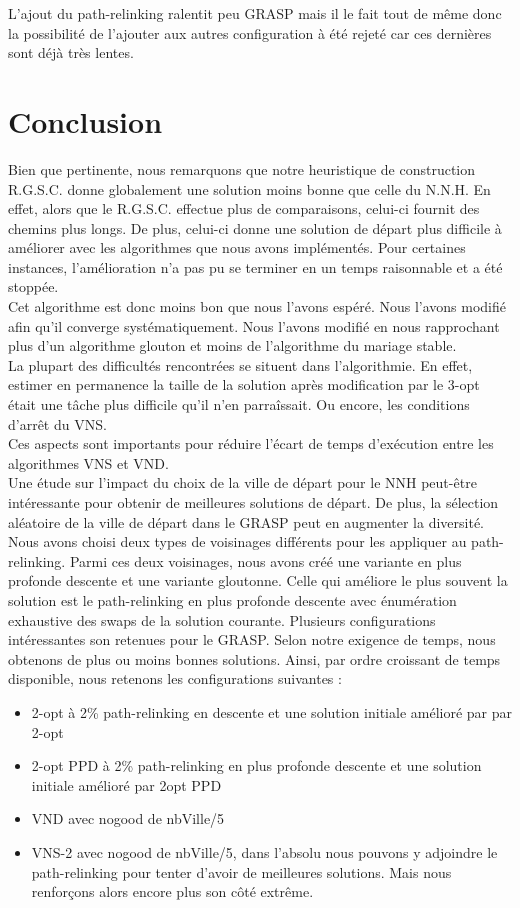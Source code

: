 \documentclass[12pt,a4paper]{article}
\begin{document}
L'ajout du path-relinking ralentit peu GRASP mais il le fait tout de même donc la possibilité de l'ajouter aux autres configuration à été rejeté car ces dernières sont déjà très lentes.\\

\section{Conclusion}
Bien que pertinente, nous remarquons que notre heuristique de construction R.G.S.C. donne globalement une solution moins bonne que celle du N.N.H. En effet, alors que le R.G.S.C. effectue plus de comparaisons, celui-ci fournit des chemins plus longs. De plus, celui-ci donne une solution de départ plus difficile à améliorer avec les algorithmes que nous avons implémentés. Pour certaines instances, l'amélioration n'a pas pu se terminer en un temps raisonnable et a été stoppée.\\
Cet algorithme est donc moins bon que nous l'avons espéré. Nous l'avons modifié afin qu'il converge systématiquement. Nous l'avons modifié en nous rapprochant plus d'un algorithme glouton et moins de l'algorithme du mariage stable. \\
La plupart des difficultés rencontrées se situent dans l'algorithmie. En effet, estimer en permanence la taille de la solution après modification par le 3-opt était une tâche plus difficile qu'il n'en parraîssait. Ou encore, les conditions d'arrêt du VNS.\\
Ces aspects sont importants pour réduire l'écart de temps d’exécution entre les algorithmes VNS et VND.\\
Une étude sur l'impact du choix de la ville de départ pour le NNH peut-être intéressante pour obtenir de meilleures solutions de départ. De plus, la sélection aléatoire de la ville de départ dans le GRASP peut en augmenter la diversité.\\
Nous avons choisi deux types de voisinages différents pour les appliquer au path-relinking. Parmi ces deux voisinages, nous avons créé une variante en plus profonde descente et une variante gloutonne. Celle qui améliore le plus souvent la solution est le path-relinking en plus profonde descente avec énumération exhaustive des swaps de la solution courante.
Plusieurs configurations intéressantes son retenues pour le GRASP. Selon notre exigence de temps, nous obtenons de plus ou moins bonnes solutions. Ainsi, par ordre croissant de temps disponible, nous retenons les configurations suivantes :
\begin{itemize}
\item 2-opt à 2\% path-relinking en descente et une solution initiale amélioré par par 2-opt
\item 2-opt PPD à 2\% path-relinking en plus profonde descente et une solution initiale amélioré par 2opt PPD
\item VND avec nogood de nbVille/5
\item VNS-2 avec nogood de nbVille/5, dans l'absolu nous pouvons y adjoindre le path-relinking pour tenter d'avoir de meilleures solutions. Mais nous renforçons alors encore plus son côté extrême.
\end{itemize}
\end{document}
